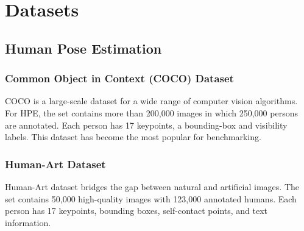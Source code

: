 \documentclass[conference]{IEEEtran}
\begin{document}
\begin{figure}[h]
	\centering
\end{figure}

\section{Datasets}
\subsection{Human Pose Estimation}
\subsubsection{Common Object in Context (COCO) Dataset \cite{Lin2014}}
COCO is a large-scale dataset for a wide range of computer vision algorithms.
For HPE, the set contains more than 200,000 images in which 250,000 persons are annotated.
Each person has 17 keypoints, a bounding-box and visibility labels.
This dataset has become the most popular for benchmarking.

\subsubsection{Human-Art Dataset \cite{Ju2023}}
Human-Art dataset bridges the gap between natural and artificial images.
The set contains 50,000 high-quality images with 123,000 annotated humans.
Each person has 17 keypoints, bounding boxes, self-contact points, and text information.
\end{document}
